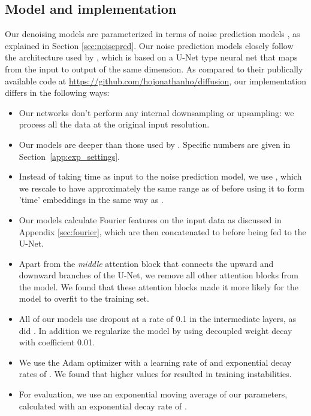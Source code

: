 \documentclass{article}
\begin{document}
\subsection{Model and implementation}
\label{app:model}
Our denoising models are parameterized in terms of noise prediction models , as explained in Section \ref{sec:noisepred}. Our noise prediction models  closely follow the architecture used by \cite{ho2020denoising}, which is based on a U-Net type neural net \citep{ronneberger2015u} that maps from the input  to output of the same dimension. As compared to their publically available code at \url{https://github.com/hojonathanho/diffusion}, our implementation differs in the following ways:
\begin{itemize}
    \item Our networks don't perform any internal downsampling or upsampling: we process all the data at the original input resolution.
    \item Our models are deeper than those used by \cite{ho2020denoising}. Specific numbers are given in Section~\ref{app:exp_settings}.
    \item Instead of taking time  as input to the noise prediction model, we use , which we rescale to have approximately the same range as  of  before using it to form 'time' embeddings in the same way as \cite{ho2020denoising}. 
    \item Our models calculate Fourier features on the input data  as discussed in Appendix \ref{sec:fourier}, which are then concatenated to  before being fed to the U-Net.
    \item Apart from the \emph{middle} attention block that connects the upward and downward branches of the U-Net, we remove all other attention blocks from the model. We found that these attention blocks made it more likely for the model to overfit to the training set.
    \item All of our models use dropout at a rate of 0.1 in the intermediate layers, as did \cite{ho2020denoising}. In addition we regularize the model by using decoupled weight decay \citep{loshchilov2017decoupled} with coefficient 0.01.
    \item We use the Adam optimizer with a learning rate of  and exponential decay rates of . We found that higher values for  resulted in training instabilities.
    \item For evaluation, we use an exponential moving average of our parameters, calculated with an exponential decay rate of .
\end{itemize}
\end{document}
